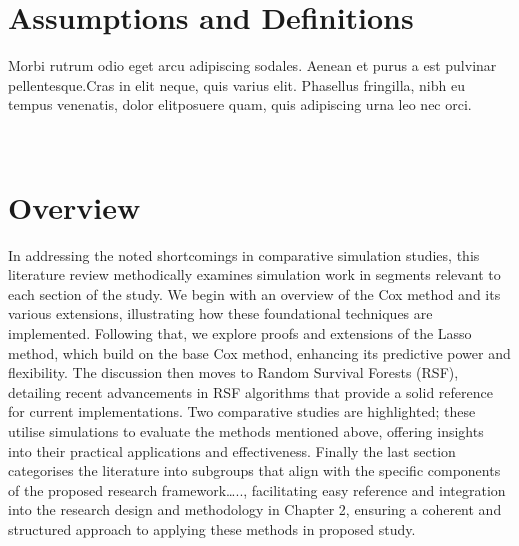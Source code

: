\section{Assumptions and Definitions}

Morbi rutrum odio eget arcu adipiscing sodales. Aenean et purus a est pulvinar pellentesque.Cras in elit neque,  quis varius elit. Phasellus fringilla,  nibh eu tempus venenatis,  dolor elitposuere quam, quis adipiscing urna leo nec orci.  

\par\vspace{0.5cm}
\noindent {}\\

\section{Overview}
\noindent
In addressing the noted shortcomings in comparative simulation studies, this literature review methodically examines simulation work in segments relevant to each section of the study. We begin with an overview of the Cox method and its various extensions, illustrating how these foundational techniques are implemented. Following that, we explore proofs and extensions of the Lasso method, which build on the base Cox method, enhancing its predictive power and flexibility. The discussion then moves to Random Survival Forests (RSF), detailing recent advancements in RSF algorithms that provide a solid reference for current implementations. Two comparative studies are highlighted; these utilise simulations to evaluate the methods mentioned above, offering insights into their practical applications and effectiveness. Finally the last section categorises the literature into subgroups that align with the specific components of the proposed research framework….., facilitating easy reference and integration into the research design and methodology in Chapter 2, ensuring a coherent and structured approach to applying these methods in proposed study.
